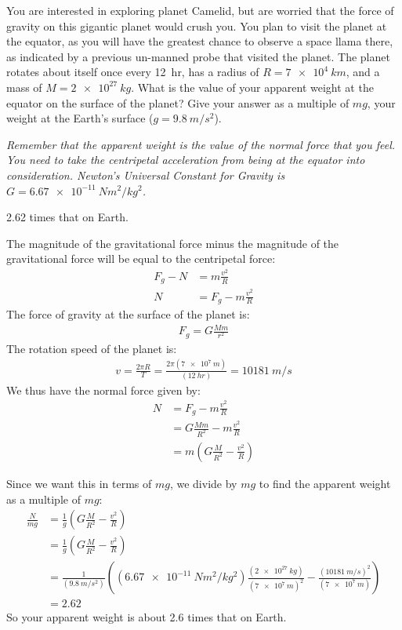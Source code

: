 \question You are interested in exploring planet Camelid, but are worried that the force of gravity on this gigantic planet would crush you. You plan to visit the planet at the equator, as you will have the greatest chance to observe a space llama there, as indicated by a previous un-manned probe that visited the planet. The planet rotates about itself once every \SI{12}{hr}, has a radius of $R=\SI{7e4}{km}$, and a mass of $M=\SI{2e27}{kg}$. What is the value of your apparent weight at the equator on the surface of the planet? Give your answer as a multiple of $mg$, your weight at the Earth's surface ($g=\SI{9.8}{m/s^2}$).

\textit{Remember that the apparent weight is the value of the normal force that you feel. You need to take the centripetal acceleration from being at the equator into consideration. Newton's Universal Constant for Gravity is $G=\SI{6.67e-11}{Nm^2/kg^2}$.}

\begin{finalanswer}
2.62 times that on Earth.
\end{finalanswer}
\begin{solution}
The magnitude of the gravitational force minus the magnitude of the gravitational force will be equal to the centripetal force:
\begin{align*}
F_g-N&=m\frac{v^2}{R}\\
N&=F_g-m\frac{v^2}{R}
\end{align*}
The force of gravity at the surface of the planet is:
\begin{align*}
F_g=G\frac{Mm}{r^2}
\end{align*}
The rotation speed of the planet is:
\begin{align*}
v=\frac{2\pi R}{T}=\frac{2\pi (\SI{7e7}{m})}{(\SI{12}{hr})}=\SI{10181}{m/s}
\end{align*}
We thus have the normal force given by:
\begin{align*}
N&=F_g-m\frac{v^2}{R}\\
&= G\frac{Mm}{R^2}-m\frac{v^2}{R}\\
&= m\left( G\frac{M}{R^2}-\frac{v^2}{R}  \right)
\end{align*}

Since we want this in terms of $mg$, we divide by $mg$ to find the apparent weight as a multiple of $mg$:
\begin{align*}
\frac{N}{mg} &=\frac{1}{g}\left( G\frac{M}{R^2}-\frac{v^2}{R}  \right)\\
&=\frac{1}{g}\left( G\frac{M}{R^2}-\frac{v^2}{R}  \right)\\
&=\frac{1}{(\SI{9.8}{m/s^2})}\left( (\SI{6.67e-11}{Nm^2/kg^2})\frac{(\SI{2e27}{kg})}{(\SI{7e7}{m})^2}-\frac{(\SI{10181}{m/s})^2}{(\SI{7e7}{m})}  \right)\\
&=2.62
\end{align*}
So your apparent weight is about 2.6 times that on Earth. 
\end{solution}


